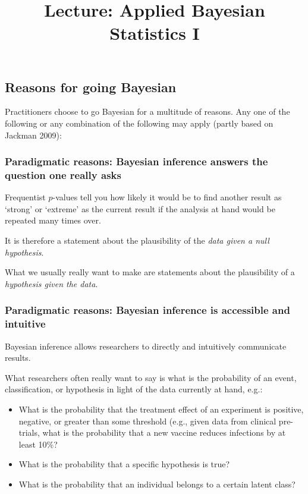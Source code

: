 \documentclass[
  11pt,
]{article}
\title{Lecture: Applied Bayesian Statistics I}
\author{}
\date{\vspace{-2.5em}}
\providecommand{\tightlist}{%
  \setlength{\itemsep}{0pt}\setlength{\parskip}{0pt}}
\begin{document}
\maketitle

\hypertarget{reasons-for-going-bayesian}{%
\subsection{Reasons for going Bayesian}\label{reasons-for-going-bayesian}}

Practitioners choose to go Bayesian for a multitude of reasons. Any one
of the following or any combination of the following may apply (partly
based on Jackman 2009):

\hypertarget{paradigmatic-reasons-bayesian-inference-answers-the-question-one-really-asks}{%
\subsubsection{Paradigmatic reasons: Bayesian inference answers the question one really asks}\label{paradigmatic-reasons-bayesian-inference-answers-the-question-one-really-asks}}

Frequentist \(p\)-values tell you how likely it would be to find another
result as `strong' or `extreme' as the current result if the analysis at
hand would be repeated many times over.

It is therefore a statement about the plausibility of the \emph{data given a
null hypothesis}.

What we usually really want to make are statements about the
plausibility of a \emph{hypothesis given the data}.

\hypertarget{paradigmatic-reasons-bayesian-inference-is-accessible-and-intuitive}{%
\subsubsection{Paradigmatic reasons: Bayesian inference is accessible and intuitive}\label{paradigmatic-reasons-bayesian-inference-is-accessible-and-intuitive}}

Bayesian inference allows researchers to directly and intuitively
communicate results.

What researchers often really want to say is what is the probability of
an event, classification, or hypothesis in light of the data currently
at hand, e.g.:

\begin{itemize}
\tightlist
\item
  What is the probability that the treatment effect of an experiment
  is positive, negative, or greater than some threshold (e.g., given
  data from clinical pre-trials, what is the probability that a new
  vaccine reduces infections by at least 10\%?
\item
  What is the probability that a specific hypothesis is true?
\item
  What is the probability that an individual belongs to a certain
  latent class?
\end{itemize}
\end{document}

